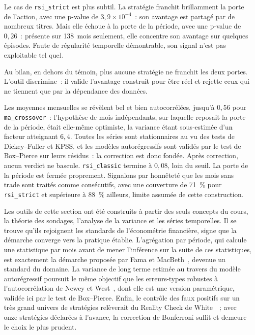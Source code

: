 Le cas de \texttt{rsi\_strict} est plus subtil. La stratégie franchit
brillamment la porte de l'action, avec une p-value de
$3{,}9\times10^{-4}$~: son avantage est partagé par de nombreux titres.
Mais elle échoue à la porte de la période, avec une p-value de
$0{,}26$~: présente sur 138~mois seulement, elle concentre son avantage
sur quelques épisodes. Faute de régularité temporelle démontrable, son
signal n'est pas exploitable tel quel.

Au bilan, en dehors du témoin, plus aucune stratégie ne franchit les
deux portes. L'outil discrimine~: il valide l'avantage construit pour
être réel et rejette ceux qui ne tiennent que par la dépendance des
données.



Les moyennes mensuelles se révèlent bel et bien autocorrélées, jusqu'à
$0{,}56$ pour \texttt{ma\_crossover}~: l'hypothèse de mois indépendants,
sur laquelle reposait la porte de la période, était elle-même optimiste,
la variance étant sous-estimée d'un facteur atteignant $6{,}4$. Toutes
les séries sont stationnaires au vu des tests de Dickey--Fuller et KPSS,
et les modèles autorégressifs sont validés par le test de Box--Pierce
sur leurs résidus~: la correction est donc fondée. Après correction,
aucun verdict ne bascule. \texttt{rsi\_classic} termine à $0{,}08$, loin
du seuil. La porte de la période est fermée proprement. Signalons par
honnêteté que les mois sans trade sont traités comme consécutifs, avec
une couverture de 71~\% pour \texttt{rsi\_strict} et supérieure à 88~\%
ailleurs, limite assumée de cette construction.



Les outils de cette section ont été construits à partir des seuls
concepts du cours, la théorie des sondages, l'analyse de la variance et
les séries temporelles. Il se trouve qu'ils rejoignent les standards de
l'économétrie financière, signe que la démarche converge vers la
pratique établie. L'agrégation par période, qui calcule une statistique
par mois avant de mener l'inférence sur la suite de ces statistiques,
est exactement la démarche proposée par Fama et
MacBeth~\cite{famamacbeth1973}, devenue un standard du domaine. La
variance de long terme estimée au travers du modèle autorégressif
poursuit le même objectif que les erreurs-types robustes à
l'autocorrélation de Newey et West~\cite{neweywest1987}, dont elle est
une version paramétrique, validée ici par le test de Box--Pierce. Enfin,
le contrôle des faux positifs sur un très grand univers de stratégies
relèverait du Reality Check de White~\cite{white2000}~; avec onze
stratégies déclarées à l'avance, la correction de Bonferroni suffit et
demeure le choix le plus prudent.

